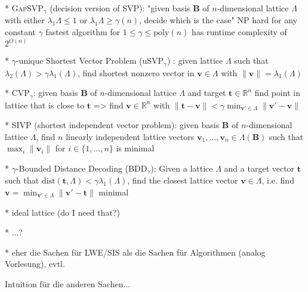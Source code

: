 \documentclass[
  a4paper,  %
  twoside,  %
  bibliography=totoc,
  headsepline,
  cleardoublepage=empty,
  parskip=half,
  draft=false
]{scrbook}
\begin{document}
* \textsc{GapSVP}$_\gamma$ (decision version of \textsc{SVP}): "given basis $\mathbf{B}$ of $n$-dimensional lattice $\Lambda$ with either $\lambda_1{\Lambda} \leq 1$ or $\lambda_1{\Lambda} \geq \gamma(n)$, decide which is the case" %
NP hard for any constant $\gamma$ %
fastest algorithm for $1\leq \gamma \leq \text{poly}(n)$ has runtime complexity of $2^{O(n)}$

* $\gamma$-unique Shortest Vector Problem (uSVP$_\gamma$) \cite{LM09}: given lattice $\Lambda$ such that $\lambda_2(\Lambda) > \gamma \lambda_1(\Lambda)$, find shortest nonzero vector in $\mathbf{v} \in \Lambda$ with $\|\mathbf{v}\| = \lambda_1(\Lambda)$

* CVP$_\gamma$: given  basis $\mathbf{B}$ of $n$-dimensional lattice $\Lambda$ and target $\mathbf{t}\in\mathbb{R}^n$ find point in lattice that is close to $\mathbf{t}$ => find  $\mathbf{v} \in \mathbb{R}^n$ with $\|\mathbf{t} - \mathbf{v}\| < \gamma \min_{\mathbf{v}' \in \Lambda} \|\mathbf{v}' - \mathbf{v}\|$

* \textsc{SIVP} (shortest independent vector problem): given  basis $\mathbf{B}$ of $n$-dimensional lattice $\Lambda$, find $n$ linearly independent lattice vectors $\mathbf{v}_1, \ldots, \mathbf{v}_n \in \Lambda(\mathbf{B})$ such that $\max_i \|\mathbf{v}_i\|$ for $i \in \{1, \ldots, n\}$ is minimal

* $\gamma$-Bounded Distance Decoding (BDD$_\gamma$): Given a lattice $\Lambda$ and a target vector $\mathbf{t}$ such that $\text{dist}(\mathbf{t}, \Lambda) < \gamma \lambda_1(\Lambda)$, find the closest lattice vector $\mathbf{v} \in \Lambda$, i.e. find $\mathbf{v} = \min_{\mathbf{v}' \in \Lambda} \|\mathbf{v}' - \mathbf{t}\|$ minimal \cite{LM09}


* ideal lattice (do I need that?)

* ...?

* eher die Sachen für LWE/SIS als die Sachen für Algorithmen (analog Vorlesung), evtl.

Intuition für die anderen Sachen...
\end{document}
